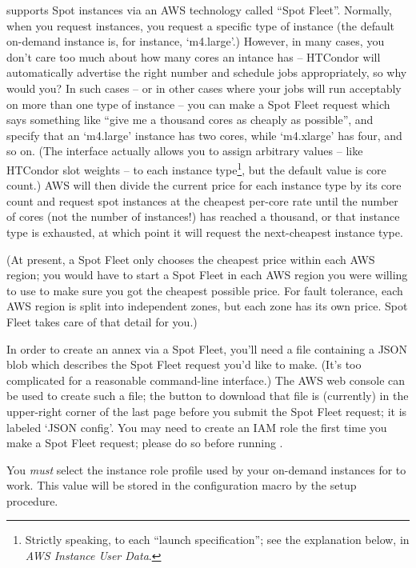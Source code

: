  supports Spot instances via an AWS technology called
``Spot Fleet''.  Normally, when you request instances, you request a specific
type of instance (the default on-demand instance is, for instance, `m4.large'.)
However, in many cases, you don't care too much about how many cores an
intance has -- HTCondor will automatically advertise the right number and
schedule jobs appropriately, so why would you?  In such cases -- or in
other cases where your jobs will run acceptably on more than one type of
instance -- you can make a Spot Fleet request which says something like
``give me a thousand cores as cheaply as possible'', and specify that
an `m4.large' instance has two cores, while `m4.xlarge' has four, and so
on.  (The interface actually allows you to assign arbitrary values --
like HTCondor slot weights -- to each instance
type\footnote{Strictly speaking, to each ``launch specification''; see
the explanation below, in \emph{AWS Instance User Data}.},
but the default value is core count.)  AWS will then divide the current price for each
instance type by its core count and request spot instances at the cheapest
per-core rate until the number of cores (not the number of instances!) has
reached a thousand, or that instance type is exhausted, at which point it will
request the next-cheapest instance type.

(At present, a Spot Fleet only chooses the cheapest price within each
AWS region; you would have to start a Spot Fleet in each AWS region you
were willing to use to make sure you got the cheapest possible price.  For
fault tolerance, each AWS region is split into independent zones, but each
zone has its own price.  Spot Fleet takes care of that detail for you.)

In order to create an annex via a Spot Fleet, you'll need a file containing
a JSON blob which describes the Spot Fleet request you'd like to make.  (It's
too complicated for a reasonable command-line interface.)  The AWS web
console can be used to create such a file; the button to download that
file is (currently) in the upper-right corner of the last page before
you submit the Spot Fleet request; it is labeled `JSON config'.  You
may need to create an IAM role the first time you make a Spot Fleet
request; please do so before running .

You \emph{must} select the instance role profile used by your on-demand
instances for  to work.  This value will be stored in the
configuration macro 
by the setup procedure.

